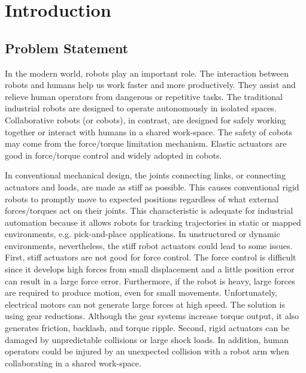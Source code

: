 \documentclass[./main.tex]{subfiles}
\begin{document}
\chapter{Introduction}

\section{Problem Statement}
In the modern world, robots play an important role. The interaction between robots and humans help us work faster and more productively. They assist and relieve human operators from dangerous or repetitive tasks. The traditional industrial robots are designed to operate autonomously in isolated spaces. Collaborative robots (or cobots), in contrast, are designed for safely working together or interact with humans in a shared work-space. The safety of cobots may come from the force/torque limitation mechanism. Elastic actuators are good in force/torque control and widely adopted in cobots.

In conventional mechanical design, the joints connecting links, or connecting actuators and loads, are made as stiff as possible. This causes conventional rigid robots to promptly move to expected positions regardless of what external forces/torques act on their joints. This characteristic is adequate for industrial automation because it allows robots for tracking trajectories in static or mapped environments, e.g. pick-and-place applications. In unstructured or dynamic environments, nevertheless, the stiff robot actuators could lead to some issues. First, stiff actuators are not good for force control. The force control is difficult since it develops high forces from small displacement and a little position error can result in a large force error. Furthermore, if the robot is heavy, large forces are required to produce motion, even for small movements. Unfortunately, electrical motors can not generate large forces at high speed. The solution is using gear reductions. Although the gear systems increase torque output, it also generates friction, backlash, and torque ripple. Second, rigid actuators can be damaged by unpredictable collisions or large shock loads. In addition, human operators could be injured by an unexpected collision with a robot arm when collaborating in a shared work-space.
\end{document}
